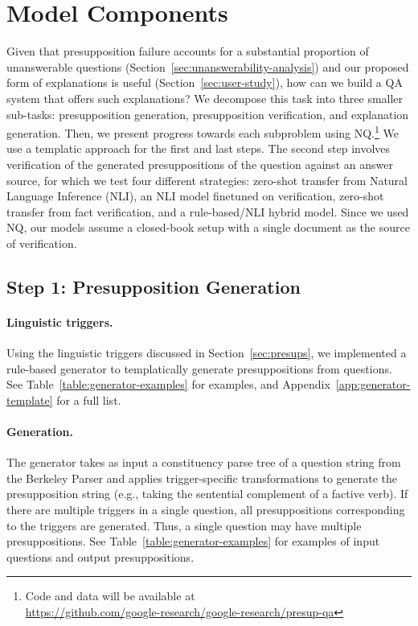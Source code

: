 \documentclass[11pt,a4paper]{article}
\begin{document}
\section{Model Components}
\label{sec:approach}
Given that presupposition failure accounts for a substantial proportion of unanswerable questions (Section~\ref{sec:unanswerability-analysis}) and our proposed form of explanations is useful (Section~\ref{sec:user-study}), how can we build a QA system that offers such explanations? We decompose this task into three smaller sub-tasks: presupposition generation, presupposition verification, and explanation generation. Then, we present progress towards each subproblem using NQ.\footnote{Code and data will be available at\\\url{https://github.com/google-research/google-research/presup-qa}} We use a templatic approach for the first and last steps. The second step involves verification of the generated presuppositions of the question against an answer source, for which we test four different strategies: zero-shot transfer from Natural Language Inference (NLI), an NLI model finetuned on verification, zero-shot transfer from fact verification, and a rule-based/NLI hybrid model. Since we used NQ, our models assume a closed-book setup with a single document as the source of verification.

\subsection{Step 1: Presupposition Generation}
\label{subsec:presup-generation}

\paragraph{Linguistic triggers.} 
\noindent Using the linguistic triggers discussed in Section~\ref{sec:presups}, we implemented a rule-based generator to templatically generate presuppositions from questions. See Table~\ref{table:generator-examples} for examples, and Appendix~\ref{app:generator-template} for a full list.

\paragraph{Generation.} The generator takes as input a constituency parse tree of a question string from the Berkeley Parser \citep{petrov-etal-2006-learning} and applies trigger-specific transformations to generate the presupposition string (e.g., taking the sentential complement of a factive verb). If there are multiple triggers in a single question, all presuppositions corresponding to the triggers are generated. Thus, a single question may have multiple presuppositions. See Table~\ref{table:generator-examples} for examples of input questions and output presuppositions. 
\end{document}
